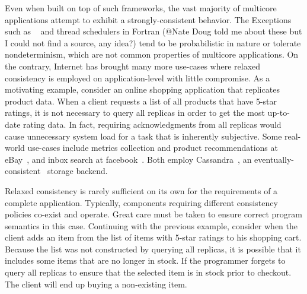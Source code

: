 \documentclass[]{usiinfprospectus}
\begin{document}
Even when built on top of such frameworks, the vast majority of multicore applications attempt to exhibit a strongly-consistent behavior. The Exceptions such as ~\cite{concurrentskiplistmap} and thread schedulers in Fortran (@Nate Doug told me about these but I could not find a source, any idea?) tend to be probabilistic in nature or tolerate nondeterminism, which are not common properties of multicore applications. On the contrary, Internet has brought many more use-cases where relaxed consistency is employed on application-level with little compromise. As a motivating example, consider an online shopping application that replicates product data. When a client requests a list of all products that have 5-star ratings, it is not necessary to query all replicas in order to get the most up-to-date rating data. In fact, requiring acknowledgments from all replicas would cause unnecessary system load for a task that is inherently subjective. Some real-world use-cases include metrics collection and product recommendations at eBay~\cite{cassandraebay}, and inbox search at facebook~\cite{lakshman2010cassandra}. Both employ Cassandra~\cite{lakshman2010cassandra}, an eventually-consistent~\cite{vogels2009eventually} storage backend.








Relaxed consistency is rarely sufficient on its own for the requirements of a complete application. Typically, components requiring different consistency policies co-exist and operate. Great care must be taken to ensure correct program semantics in this case. Continuing with the previous example, consider  when the client adds an item from the list of items with 5-star ratings to his shopping cart. Because the list was not constructed by querying all replicas, it is possible that it includes some items that are no longer in stock. If the programmer forgets to query all replicas to ensure that the selected item is in stock prior to checkout. The client will end up buying a non-existing item.
\end{document}
